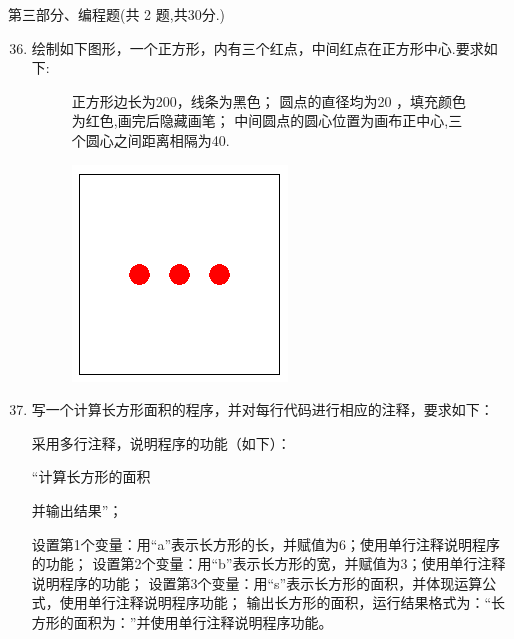 \documentclass[11pt]{ctexart}
\begin{document}
    \newpage
    {\noindent\heiti 第三部分、编程题(共 2 题,共30分.)}
    \begin{enumerate}
        \setcounter{enumi}{35}
        
        \item 绘制如下图形，一个正方形，内有三个红点，中间红点在正方形中心.要求如下:
        \begin{figure}[htbp]
            \begin{minipage}{.68\textwidth}
                \begin{tasks}[label=(\arabic*)]
                    \task 正方形边长为200，线条为黑色；
                    \task 圆点的直径均为20 ，填充颜色为红色,画完后隐藏画笔；
                    \task 中间圆点的圆心位置为画布正中心,三个圆心之间距离相隔为40.
                \end{tasks}
            \end{minipage}
            \begin{minipage}{.3\textwidth}
                \centering
                \includegraphics[width=.4\textwidth]{36.png}
            \end{minipage}
        \end{figure}
        \vfill

        \item 写一个计算长方形面积的程序，并对每行代码进行相应的注释，要求如下：
        
        \begin{tasks}[label=(\arabic*)]
            \task 采用多行注释，说明程序的功能（如下）：
            
            “计算长方形的面积
            
            并输出结果”；

            \task 设置第1个变量：用“a”表示长方形的长，并赋值为6；使用单行注释说明程序的功能；
            \task 设置第2个变量：用“b”表示长方形的宽，并赋值为3；使用单行注释说明程序的功能；
            \task 设置第3个变量：用“s”表示长方形的面积，并体现运算公式，使用单行注释说明程序功能；
            \task 输出长方形的面积，运行结果格式为：“长方形的面积为：”并使用单行注释说明程序功能。
        \end{tasks}
        \vfill
    \end{enumerate}
\end{document}
